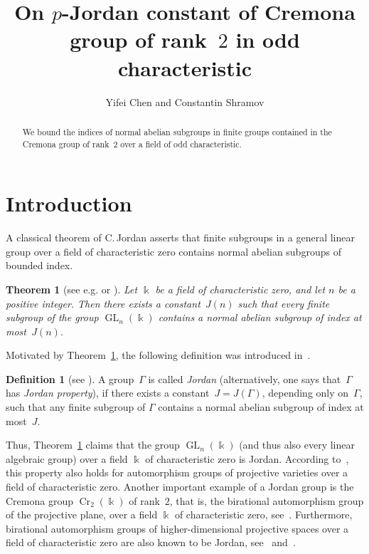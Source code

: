 \documentclass[12pt]{amsart}
\title{On $p$-Jordan constant of Cremona group of rank~$2$ in odd characteristic}
\author{Yifei Chen and Constantin Shramov}
\numberwithin{equation}{section}
\newtheorem{theorem}[subsection]{Theorem}
\theoremstyle{definition}
\newtheorem{definition}[subsection]{Definition}
\DeclareMathOperator{\Cr}{Cr}
\DeclareMathOperator{\GL}{GL}
\begin{document}
\maketitle

\begin{abstract}
We bound the indices of normal abelian subgroups in finite
groups contained in the Cremona group of rank~$2$ over a field of odd
characteristic.
\end{abstract}


\tableofcontents

\section{Introduction}

A classical theorem of C.\,Jordan
asserts that finite subgroups
in a general linear group
over a field of characteristic zero contains normal abelian subgroups
of bounded index.

\begin{theorem}[{see e.g. \cite[\S40]{Jordan} or \cite[Theorem~9.9]{Serre-FiniteGroups}}]
\label{theorem:Jordan}
Let $\Bbbk$ be a field of characteristic zero,
and let $n$ be a positive integer.
Then there exists a constant~$J(n)$ such that
every finite subgroup of the group $\GL_n(\Bbbk)$
contains a normal abelian subgroup of index at most~$J(n)$.
\end{theorem}


Motivated by Theorem~\ref{theorem:Jordan}, the following definition
was introduced in~\cite{Popov}.

\begin{definition}[{see \cite[Definition~2.1]{Popov}}]
\label{definition:Jordan}
A group~$\Gamma$ is called \emph{Jordan}
(alternatively, one says that~$\Gamma$ has \emph{Jordan property}),
if there exists a constant~\mbox{$J=J(\Gamma)$},
depending only on~$\Gamma$,
such that any finite subgroup of $\Gamma$
contains a normal abelian subgroup of index at most~$J$.
\end{definition}

Thus, Theorem~\ref{theorem:Jordan} claims that the group
$\GL_n(\Bbbk)$ (and thus also every linear algebraic group)
over a field $\Bbbk$ of characteristic zero is Jordan.
According to~\mbox{\cite[Theorem~1.6]{MengZhang}}, this property also holds
for automorphism groups of projective varieties over a field of characteristic zero.
Another important example of a Jordan group is the Cremona group
$\Cr_2(\Bbbk)$ of rank~$2$, that is,
the birational automorphism group of the projective plane,
over a field $\Bbbk$ of characteristic zero,
see~\mbox{\cite[Theorem~5.3]{Serre-2009}}. Furthermore,
birational automorphism groups of higher-dimensional projective spaces
over a field of characteristic zero
are also known to be Jordan, see~\mbox{\cite[Theorem~1.8]{ProkhorovShramov-Cr}} and~\cite{Birkar}.
\end{document}
